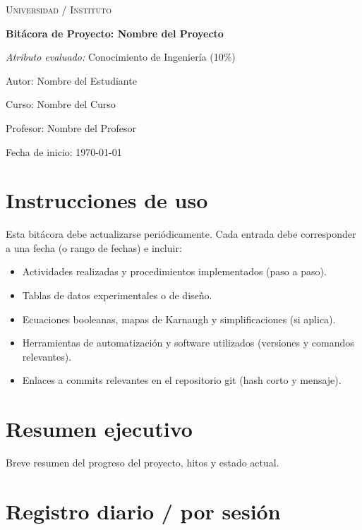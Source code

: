 \documentclass[12pt,a4paper]{article}
\begin{document}
\begin{titlepage}
  \centering
  {\scshape\LARGE Universidad / Instituto \par}
  \vspace{1cm}
  {\huge\bfseries Bitácora de Proyecto: Nombre del Proyecto \par}
  \vspace{1.5cm}
  {\Large \textit{Atributo evaluado:} Conocimiento de Ingeniería (10\%) \par}
  \vfill
  {\large Autor: Nombre del Estudiante \par}
  {\large Curso: Nombre del Curso \par}
  {\large Profesor: Nombre del Profesor \par}
  \vspace{1cm}
  {\large Fecha de inicio: \today \par}
\end{titlepage}

\tableofcontents
\newpage

\section{Instrucciones de uso}
Esta bitácora debe actualizarse periódicamente. Cada entrada debe corresponder a una fecha (o rango de fechas) e incluir:
\begin{itemize}
  \item Actividades realizadas y procedimientos implementados (paso a paso).
  \item Tablas de datos experimentales o de diseño.
  \item Ecuaciones booleanas, mapas de Karnaugh y simplificaciones (si aplica).
  \item Herramientas de automatización y software utilizados (versiones y comandos relevantes).
  \item Enlaces a commits relevantes en el repositorio git (hash corto y mensaje).
\end{itemize}

\section{Resumen ejecutivo}
Breve resumen del progreso del proyecto, hitos y estado actual.

\section{Registro diario / por sesión}
\end{document}
